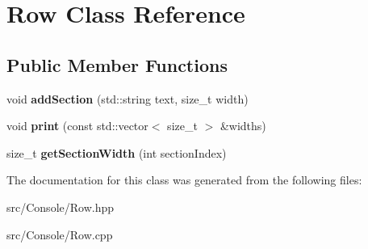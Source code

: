 \hypertarget{class_row}{}\section{Row Class Reference}
\label{class_row}
\subsection*{Public Member Functions}
\begin{DoxyCompactItemize}
\item 
\mbox{\label{class_row_a57369f24401a28e8323c276060418d79}} 
void {\bfseries add\+Section} (std\+::string text, size\+\_\+t width)
\item 
\mbox{\label{class_row_ad5b5f2b44e582b3828bca6cf67455577}} 
void {\bfseries print} (const std\+::vector$<$ size\+\_\+t $>$ \&widths)
\item 
\mbox{\label{class_row_a9ad5859c048f68ea205f11b5726c44c4}} 
size\+\_\+t {\bfseries get\+Section\+Width} (int section\+Index)
\end{DoxyCompactItemize}


The documentation for this class was generated from the following files\+:\begin{DoxyCompactItemize}
\item 
src/\+Console/Row.\+hpp\item 
src/\+Console/Row.\+cpp\end{DoxyCompactItemize}
